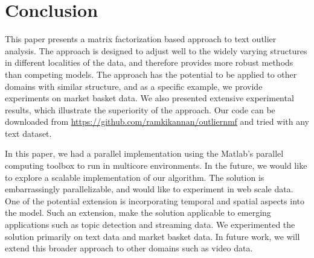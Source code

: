 \section{Conclusion}
\label{sec:conclusion}

This paper presents a matrix factorization based approach to text
outlier analysis. The approach is designed to adjust well to the
widely varying structures in different localities of the data, and
therefore provides more robust methods than competing models. The
approach has the potential to be applied to other domains with
similar structure, and as a specific example, we provide experiments
on market  basket data. We also presented extensive experimental
results, which illustrate the superiority of the approach.  
Our code can be downloaded from 
\url{https://github.com/ramkikannan/outliernmf} and 
tried with any text dataset. 

In this paper, we had a parallel implementation using the
Matlab's parallel computing toolbox to run in multicore environments.
In the future, we would like to explore a scalable implementation
of our algorithm. The solution is embarrassingly parallelizable,
and would like to experiment in web scale data. One of the potential
extension is incorporating temporal and spatial aspects into the model.
Such an extension, make the solution applicable to emerging 
applications such as topic detection and streaming data. 
We experimented
the solution primarily on text data and market basket data. In future
work, we will extend this broader approach to other domains such as
video data.
